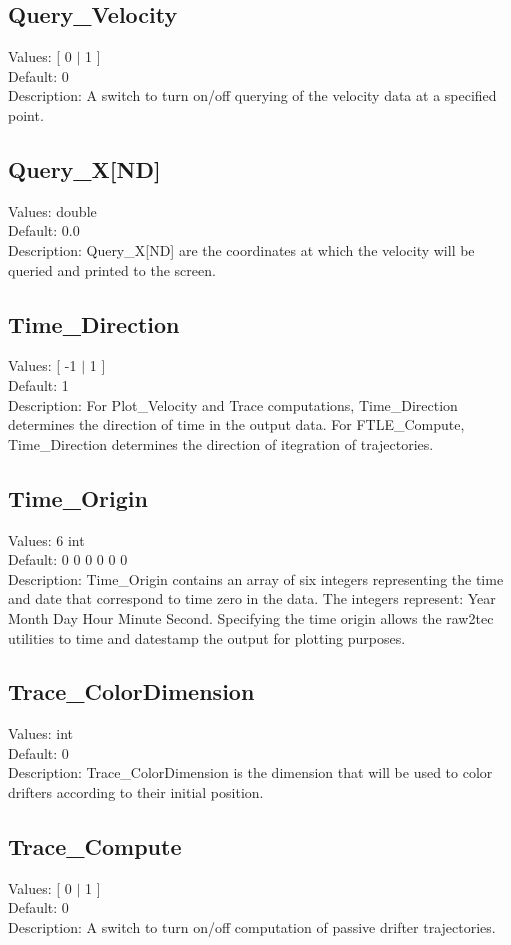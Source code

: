 \documentclass[11pt]{article}
\begin{document}
\subsection{Query\_Velocity}
Values: [ 0 $|$ 1 ]\\
Default:  0\\
Description:  A switch to turn on/off querying of the velocity data at a specified point.

\subsection{Query\_X[ND]}
Values:   double \\
Default:  0.0\\
Description:  Query\_X[ND] are the coordinates at which the velocity will be queried and printed to the screen.

\subsection{Time\_Direction}
Values: [ -1 $|$ 1 ]\\
Default: 1 \\
Description:  For Plot\_Velocity and Trace computations, Time\_Direction determines the direction of time in the output data.   For FTLE\_Compute, Time\_Direction determines the direction of itegration of trajectories. 

\subsection{Time\_Origin}
Values: 6 int\\
Default: 0 0 0 0 0 0 \\
Description:  Time\_Origin contains an array of six integers representing the time and date that correspond to time zero in the data.  The integers represent: Year Month Day Hour Minute Second.  Specifying the time origin allows the raw2tec utilities to time and datestamp the output for plotting purposes.

\subsection{Trace\_ColorDimension}
Values:   int \\
Default:  0\\
Description:  Trace\_ColorDimension is the dimension that will be used to color drifters according to their initial position.

\subsection{Trace\_Compute}
Values: [ 0 $|$ 1 ]\\
Default:  0\\
Description:  A switch to turn on/off computation of passive drifter trajectories.
\end{document}
